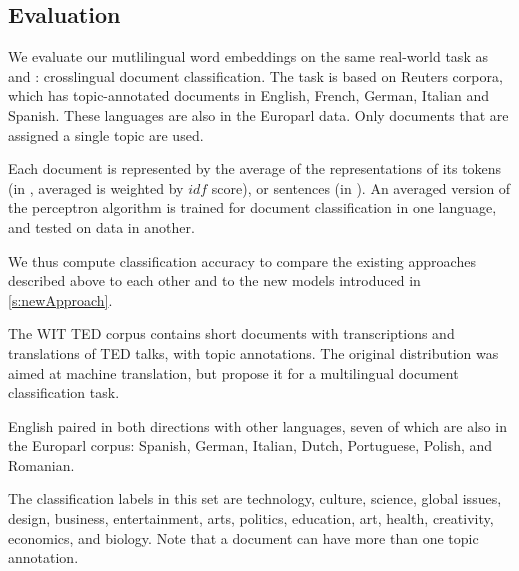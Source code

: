 

\subsection{Evaluation}
We evaluate our mutlilingual word embeddings on the same real-world task as \cite{klementiev2012inducing} and \cite{hermann2013multilingual}: crosslingual document classification. The task is based on Reuters corpora, which has topic-annotated documents in English, French, German, Italian and Spanish. These languages are also in the Europarl data. Only documents that are assigned a single topic are used.

Each document is represented by the average of the representations of its tokens (in \cite{klementiev2012inducing}, averaged is weighted by $idf$ score), or sentences (in \cite{hermann2013multilingual}).
An averaged version of the perceptron algorithm is trained for document classification in one language, and tested on data in another.

We thus compute classification accuracy to compare the existing approaches described above to each other and to the new models introduced in \ref{s:newApproach}.






The WIT TED corpus \cite{cettolo2012} contains short documents with transcriptions and translations of TED talks, with topic annotations. The original distribution was aimed at machine translation, but \cite{hermann2014multilingual} propose it for a multilingual document classification task.


English paired in both directions with other languages, seven of which are also in the Europarl corpus: Spanish, German, Italian, Dutch, Portuguese, Polish, and Romanian.

The classification labels in this set are technology, culture, science, global issues, design, business, entertainment, arts, politics, education, art, health, creativity, economics, and biology. Note that a document can have more than one topic annotation. 







